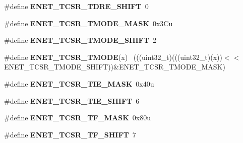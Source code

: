 \begin{DoxyCompactItemize}
\item 
\hypertarget{group___e_n_e_t___register___masks_ga82b3d1ee96813bba32fb72ae120d7047}{}\#define {\bfseries E\+N\+E\+T\+\_\+\+T\+C\+S\+R\+\_\+\+T\+D\+R\+E\+\_\+\+S\+H\+I\+F\+T}~0\label{group___e_n_e_t___register___masks_ga82b3d1ee96813bba32fb72ae120d7047}

\item 
\hypertarget{group___e_n_e_t___register___masks_gacd9d9ec96fb7eb23ef9b22525d632424}{}\#define {\bfseries E\+N\+E\+T\+\_\+\+T\+C\+S\+R\+\_\+\+T\+M\+O\+D\+E\+\_\+\+M\+A\+S\+K}~0x3\+Cu\label{group___e_n_e_t___register___masks_gacd9d9ec96fb7eb23ef9b22525d632424}

\item 
\hypertarget{group___e_n_e_t___register___masks_gaf43c487f5c76a9af36293da5b3360865}{}\#define {\bfseries E\+N\+E\+T\+\_\+\+T\+C\+S\+R\+\_\+\+T\+M\+O\+D\+E\+\_\+\+S\+H\+I\+F\+T}~2\label{group___e_n_e_t___register___masks_gaf43c487f5c76a9af36293da5b3360865}

\item 
\hypertarget{group___e_n_e_t___register___masks_gaff58bf7624c3949656e19a687af1dc14}{}\#define {\bfseries E\+N\+E\+T\+\_\+\+T\+C\+S\+R\+\_\+\+T\+M\+O\+D\+E}(x)                                          ~(((uint32\+\_\+t)(((uint32\+\_\+t)(x))$<$$<$E\+N\+E\+T\+\_\+\+T\+C\+S\+R\+\_\+\+T\+M\+O\+D\+E\+\_\+\+S\+H\+I\+F\+T))\&E\+N\+E\+T\+\_\+\+T\+C\+S\+R\+\_\+\+T\+M\+O\+D\+E\+\_\+\+M\+A\+S\+K)\label{group___e_n_e_t___register___masks_gaff58bf7624c3949656e19a687af1dc14}

\item 
\hypertarget{group___e_n_e_t___register___masks_ga1a36ae4a9731e381fa9159387670143f}{}\#define {\bfseries E\+N\+E\+T\+\_\+\+T\+C\+S\+R\+\_\+\+T\+I\+E\+\_\+\+M\+A\+S\+K}~0x40u\label{group___e_n_e_t___register___masks_ga1a36ae4a9731e381fa9159387670143f}

\item 
\hypertarget{group___e_n_e_t___register___masks_ga35fcee5f4e7c9e5b69af4039ee4fa537}{}\#define {\bfseries E\+N\+E\+T\+\_\+\+T\+C\+S\+R\+\_\+\+T\+I\+E\+\_\+\+S\+H\+I\+F\+T}~6\label{group___e_n_e_t___register___masks_ga35fcee5f4e7c9e5b69af4039ee4fa537}

\item 
\hypertarget{group___e_n_e_t___register___masks_ga79d70e9a593487d29ce2e6b9c9021c59}{}\#define {\bfseries E\+N\+E\+T\+\_\+\+T\+C\+S\+R\+\_\+\+T\+F\+\_\+\+M\+A\+S\+K}~0x80u\label{group___e_n_e_t___register___masks_ga79d70e9a593487d29ce2e6b9c9021c59}

\item 
\hypertarget{group___e_n_e_t___register___masks_gaa0ab6243262f645ae70f481ba9c33203}{}\#define {\bfseries E\+N\+E\+T\+\_\+\+T\+C\+S\+R\+\_\+\+T\+F\+\_\+\+S\+H\+I\+F\+T}~7\label{group___e_n_e_t___register___masks_gaa0ab6243262f645ae70f481ba9c33203}


\end{DoxyCompactItemize}
